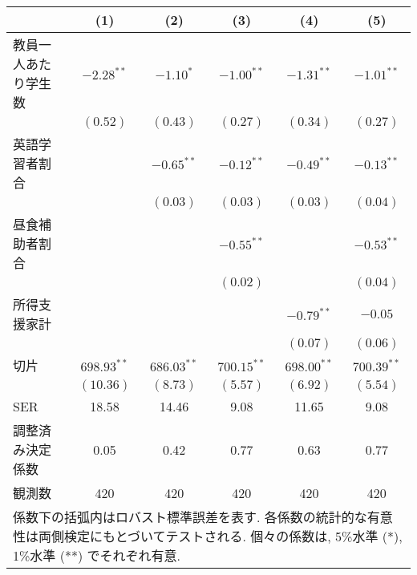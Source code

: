 
\begin{tabular}{l c c c c c }
\hline
 & (1) & (2) & (3) & (4) & (5) \\
\hline
教員一人あたり学生数 & $-2.28^{**}$  & $-1.10^{*}$   & $-1.00^{**}$  & $-1.31^{**}$  & $-1.01^{**}$  \\
           & $(0.52)$      & $(0.43)$      & $(0.27)$      & $(0.34)$      & $(0.27)$      \\
英語学習者割合    &               & $-0.65^{**}$  & $-0.12^{**}$  & $-0.49^{**}$  & $-0.13^{**}$  \\
           &               & $(0.03)$      & $(0.03)$      & $(0.03)$      & $(0.04)$      \\
昼食補助者割合    &               &               & $-0.55^{**}$  &               & $-0.53^{**}$  \\
           &               &               & $(0.02)$      &               & $(0.04)$      \\
所得支援家計     &               &               &               & $-0.79^{**}$  & $-0.05$       \\
           &               &               &               & $(0.07)$      & $(0.06)$      \\
切片         & $698.93^{**}$ & $686.03^{**}$ & $700.15^{**}$ & $698.00^{**}$ & $700.39^{**}$ \\
           & $(10.36)$     & $(8.73)$      & $(5.57)$      & $(6.92)$      & $(5.54)$      \\
\hline
SER        & 18.58         & 14.46         & 9.08          & 11.65         & 9.08          \\
調整済み決定係数   & 0.05          & 0.42          & 0.77          & 0.63          & 0.77          \\
観測数        & 420           & 420           & 420           & 420           & 420           \\
\hline
\multicolumn{6}{l}{\scriptsize{係数下の括弧内はロバスト標準誤差を表す. 各係数の統計的な有意性は両側検定にもとづいてテストされる. 個々の係数は, 5\%水準 (*), 1\%水準 (**) でそれぞれ有意.}}
\end{tabular}

